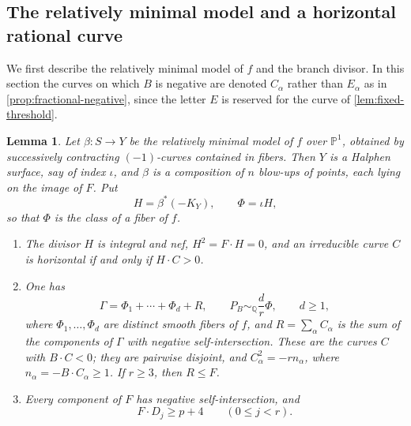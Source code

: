 \documentclass[11pt,reqno]{amsart}
\numberwithin{equation}{section}
\newtheorem{lemma}[lemma]{Lemma}
\theoremstyle{remark}
\newcommand{\prj}[1]{\mathbb{P}^{#1}}
\begin{document}
\subsection{The relatively minimal model and a horizontal rational curve}\label{sec:fixed-model}

We first describe the relatively minimal model of \(f\) and the branch divisor. In this section the curves on which \(B\) is negative are denoted \(C_\alpha\) rather than \(E_\alpha\) as in \cref{prop:fractional-negative}, since the letter \(E\) is reserved for the curve of \cref{lem:fixed-threshold}.

\begin{lemma}
\label{lem:fixed-geometry}
Let \(\beta\colon S\to Y\) be the relatively minimal model of \(f\) over \(\prj{1}\), obtained by successively contracting \((-1)\)-curves contained in fibers. Then \(Y\) is a Halphen surface, say of index \(\iota\), and \(\beta\) is a composition of \(n\) blow-ups of points, each lying on the image of \(F\). Put
\[
 H=\beta^*(-K_Y),\qquad \Phi=\iota H,
\]
so that \(\Phi\) is the class of a fiber of \(f\).
\begin{enumerate}
\item The divisor \(H\) is integral and nef, \(H^2=F\cdot H=0\), and an irreducible curve \(C\) is horizontal if and only if \(H\cdot C>0\).
\item One has
\begin{equation}\label{eq:fixed-branch-form}
 \Gamma=\Phi_1+\cdots+\Phi_d+R,\qquad
 P_B\sim_{\mathbb Q}\frac d r\Phi,\qquad d\geq1,
\end{equation}
where \(\Phi_1,\dots,\Phi_d\) are distinct smooth fibers of \(f\), and \(R=\sum_\alpha C_\alpha\) is the sum of the components of \(\Gamma\) with negative self-intersection. These are the curves \(C\) with \(B\cdot C<0\); they are pairwise disjoint, and \(C_\alpha^2=-rn_\alpha\), where \(n_\alpha=-B\cdot C_\alpha\geq1\). If \(r\geq3\), then \(R\leq F\).
\item Every component of \(F\) has negative self-intersection, and
\begin{equation}\label{eq:fixed-extra-degree}
 F\cdot D_j\geq p+4\qquad(0\leq j<r).
\end{equation}
\end{enumerate}
\end{lemma}
\end{document}
